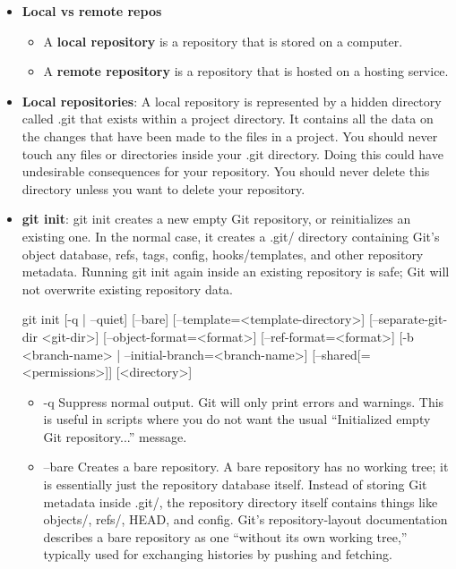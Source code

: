 \documentclass{report}
\begin{document}
    \begin{itemize}
        \item \textbf{Local vs remote repos}
            \begin{itemize}
                \item A \textbf{local repository} is a repository that is stored on a computer.
                \item A \textbf{remote repository} is a repository that is hosted on a hosting service.
            \end{itemize}
        \item \textbf{Local repositories}: A local repository is represented by a hidden directory called .git that exists within a project directory. It contains all the data on the changes that have been made to the files in a project.
            \bigbreak \noindent 
            You should never touch any files or directories inside your .git directory. Doing this could have undesirable consequences for your repository. You should never delete this directory unless you want to delete your repository.
        \item \textbf{git init}: git init creates a new empty Git repository, or reinitializes an existing one. In the normal case, it creates a .git/ directory containing Git’s object database, refs, tags, config, hooks/templates, and other repository metadata. Running git init again inside an existing repository is safe; Git will not overwrite existing repository data.
            \bigbreak \noindent 
            \begin{bashcode}
                git init [-q | --quiet] 
                [--bare] 
                [--template=<template-directory>]
                [--separate-git-dir <git-dir>] 
                [--object-format=<format>]
                [--ref-format=<format>]
                [-b <branch-name> | --initial-branch=<branch-name>]
                [--shared[=<permissions>]] 
                [<directory>]
            \end{bashcode}
            \begin{itemize}
                \item -q Suppress normal output. Git will only print errors and warnings. This is useful in scripts where you do not want the usual “Initialized empty Git repository...” message.
                \item --bare Creates a bare repository. A bare repository has no working tree; it is essentially just the repository database itself. Instead of storing Git metadata inside .git/, the repository directory itself contains things like objects/, refs/, HEAD, and config. Git’s repository-layout documentation describes a bare repository as one “without its own working tree,” typically used for exchanging histories by pushing and fetching.

\end{itemize}
\end{itemize}
\end{document}
